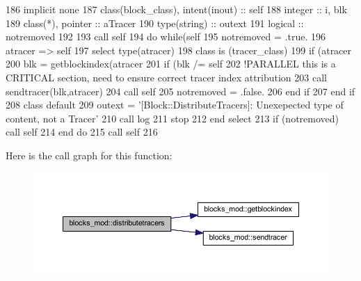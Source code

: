 \begin{DoxyCode}
186     \textcolor{keywordtype}{implicit none}
187     \textcolor{keywordtype}{class}(block\_class), \textcolor{keywordtype}{intent(inout)} :: self
188     \textcolor{keywordtype}{integer} :: i, blk
189     \textcolor{keywordtype}{class}(*), \textcolor{keywordtype}{pointer} :: aTracer
190     \textcolor{keywordtype}{type}(string) :: outext
191     \textcolor{keywordtype}{logical} :: notremoved
192 
193     \textcolor{keyword}{call }self%
194     \textcolor{keywordflow}{do} \textcolor{keywordflow}{while}(self%
195         notremoved = .true.
196         atracer => self%
197         \textcolor{keywordflow}{select type}(atracer)
198 \textcolor{keywordflow}{        class is} (tracer\_class)
199             \textcolor{keywordflow}{if} (atracer%
200                 blk = getblockindex(atracer%
201                 \textcolor{keywordflow}{if} (blk /= self%
202                     \textcolor{comment}{!PARALLEL this is a CRITICAL section, need to ensure correct tracer index attribution}
203                     \textcolor{keyword}{call }sendtracer(blk,atracer)
204                     \textcolor{keyword}{call }self%
205                     notremoved = .false.
206 \textcolor{keywordflow}{                end if}
207 \textcolor{keywordflow}{            end if}
208 \textcolor{keywordflow}{            class default}
209             outext = \textcolor{stringliteral}{'[Block::DistributeTracers]: Unexepected type of content, not a Tracer'}
210             \textcolor{keyword}{call }log%
211             stop
212 \textcolor{keywordflow}{        end select}
213         \textcolor{keywordflow}{if} (notremoved) \textcolor{keyword}{call }self%
214 \textcolor{keywordflow}{    end do}
215     \textcolor{keyword}{call }self%
216 
\end{DoxyCode}
Here is the call graph for this function\+:\nopagebreak
\begin{figure}[H]
\begin{center}
\leavevmode
\includegraphics[width=350pt]{namespaceblocks__mod_aa178415bcc40cf169744d356e1a09c6b_cgraph}
\end{center}
\end{figure}
